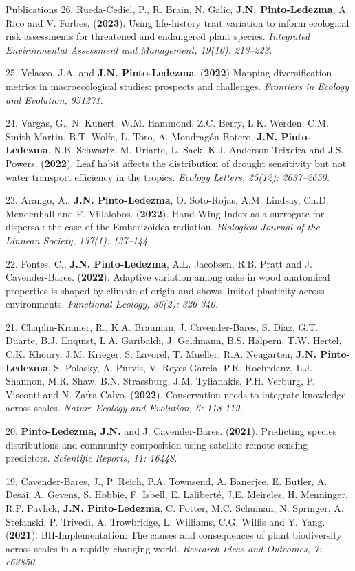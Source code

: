 \documentclass{resume} %
\begin{document}
\begin{rSection}{Publications}
{26.} {Rueda-Cediel, P., R. Brain, N. Galic, } {\bf{J.N. Pinto-Ledezma}}, {A. Rico and V. Forbes. ({\bf{2023}}). Using life-history trait variation to inform ecological risk assessments for threatened and endangered plant species.} {\em Integrated Environmental Assessment and Management, 19(10): 213–223.}

{25.} {Velasco\dag, J.A. and} {\bf{J.N. Pinto-Ledezma\dag}}. {({\bf{2022}}) Mapping diversification metrics in macroecological studies: prospects and challenges.} {\em Frontiers in Ecology and Evolution, 951271.}

{24.}  {Vargas, G., N. Kunert, W.M. Hammond, Z.C. Berry, L.K. Werden, C.M. Smith-Martin, B.T. Wolfe, L. Toro, A. Mondragón-Botero, } {\bf{J.N. Pinto-Ledezma}}, {N.B. Schwartz, M. Uriarte, L. Sack, K.J. Anderson-Teixeira and J.S. Powers. ({\bf{2022}}). Leaf habit affects the distribution of drought sensitivity but not water transport efficiency in the tropics.} {\em Ecology Letters, 25(12): 2637–2650.}

{23.} {Arango, A.,} {\bf{J.N. Pinto-Ledezma}}, {O. Soto-Rojas, A.M. Lindsay, Ch.D. Mendenhall and F. Villalobos. ({\bf{2022}}). Hand-Wing Index as a surrogate for dispersal: the case of the Emberizoidea radiation.} {\em Biological Journal of the Linnean Society, 137(1): 137–144.}

{22.} {Fontes, C.,} {\bf{J.N. Pinto-Ledezma}}, {A.L. Jacobsen, R.B. Pratt and J. Cavender-Bares. ({\bf{2022}}). Adaptive variation among oaks in wood anatomical properties is shaped by climate of origin and shows limited plasticity across environments.} {\em Functional Ecology, 36(2): 326-340.}

{21.} {Chaplin-Kramer, R., K.A. Brauman, J. Cavender-Bares, S. Díaz, G.T. Duarte, B.J. Enquist, L.A. Garibaldi, J. Geldmann, B.S. Halpern, T.W. Hertel, C.K. Khoury, J.M. Krieger, S. Lavorel, T. Mueller, R.A. Neugarten,} {\bf{J.N. Pinto-Ledezma}}, {S. Polasky, A. Purvis, V. Reyes-García, P.R. Roehrdanz, L.J. Shannon, M.R. Shaw, B.N. Strassburg, J.M. Tylianakis, P.H. Verburg, P. Visconti and N. Zafra-Calvo. ({\bf{2022}}). Conservation needs to integrate knowledge across scales.} {\em Nature Ecology and Evolution, 6: 118-119.}

{20.} {\bf{Pinto-Ledezma, J.N.}} {and J. Cavender-Bares. ({{\bf 2021}}). Predicting species distributions and community composition using satellite remote sensing predictors.} {\em Scientific Reports, 11: 16448.}

{19.} {Cavender-Bares, J., P. Reich, P.A. Townsend, A. Banerjee, E. Butler, A. Desai, A. Gevens, S. Hobbie, F. Isbell, E. Laliberté, J.E. Meireles, H. Menninger, R.P. Pavlick, {\bf{J.N. Pinto-Ledezma}}, C. Potter, M.C. Schuman, N. Springer, A. Stefanski, P. Trivedi, A. Trowbridge, L. Williams, C.G. Willis and Y. Yang. ({{\bf 2021}}). BII-Implementation: The causes and consequences of plant biodiversity across scales in a rapidly changing world.} {\em Research Ideas and Outcomes, 7: e63850}. 


\end{rSection}
\end{document}
